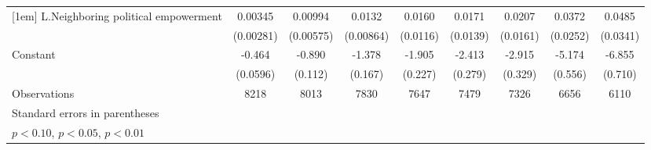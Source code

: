 \begin{table}[htbp]
\begin{tabular}{l*{8}{c}}
[1em]
L.Neighboring political empowerment&     0.00345         &     0.00994\sym{*}  &      0.0132         &      0.0160         &      0.0171         &      0.0207         &      0.0372         &      0.0485         \\
                    &   (0.00281)         &   (0.00575)         &   (0.00864)         &    (0.0116)         &    (0.0139)         &    (0.0161)         &    (0.0252)         &    (0.0341)         \\
[1em]
Constant            &      -0.464\sym{***}&      -0.890\sym{***}&      -1.378\sym{***}&      -1.905\sym{***}&      -2.413\sym{***}&      -2.915\sym{***}&      -5.174\sym{***}&      -6.855\sym{***}\\
                    &    (0.0596)         &     (0.112)         &     (0.167)         &     (0.227)         &     (0.279)         &     (0.329)         &     (0.556)         &     (0.710)         \\
\hline
Observations        &        8218         &        8013         &        7830         &        7647         &        7479         &        7326         &        6656         &        6110         \\
\hline\hline
\multicolumn{9}{l}{\footnotesize Standard errors in parentheses}\\
\multicolumn{9}{l}{\footnotesize \sym{*} \(p<0.10\), \sym{**} \(p<0.05\), \sym{***} \(p<0.01\)}\\
\end{tabular}
\end{table}
